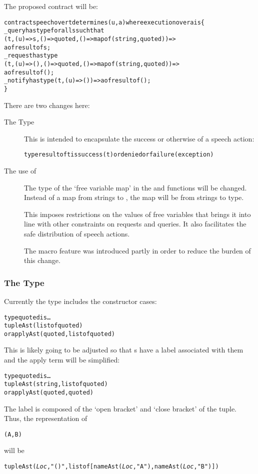 The proposed contract will be:
\begin{alltt}
contract speech over t determines (u,a) where execution over a is \{
  _query has type for all s such that 
         (t,(u)=>s,()=>quoted,()=>map of (string,quoted))=>
            a of result of s;
  _request has type
         (t,(u)=>(),()=>quoted,()=>map of (string,quoted)) => 
            a of result of ();
  _notify has type (t,(u)=>()) => a of result of ();
\}
\end{alltt}
There are two changes here: 
\begin{description}
\item[The  Type]
This is intended to encapsulate the success or otherwise of a speech action:
\begin{alltt}
type result of t is success(t) or denied or failure(exception)
\end{alltt}

\item[The use of ]
The type of the `free variable map' in the  and  functions will be changed. Instead of a map from strings to , the map will be from strings to  type.

This imposes restrictions on the values of free variables that brings it into line with other constraints on requests and queries. It also facilitates the safe distribution of speech actions.

The  macro feature was introduced partly in order to reduce the burden of this change.
\end{description}

\subsubsection{The  Type}
Currently the  type includes the constructor cases:
\begin{alltt}
type quoted is \ldots
     tupleAst(list of quoted)
  or applyAst(quoted,list of quoted)
\end{alltt}
This is likely going to be adjusted so that s have a label associated with them and the apply term will be simplified:
\begin{alltt}
type quoted is \ldots
     tupleAst(string,list of quoted)
  or applyAst(quoted,quoted)
\end{alltt}
The label is composed of the `open bracket' and `close bracket' of the tuple. Thus, the representation of
\begin{alltt}
(A,B)
\end{alltt}
will be
\begin{alltt}
tupleAst(\emph{Loc},"()",list of [nameAst(\emph{Loc},"A"), nameAst(\emph{Loc},"B")])
\end{alltt}

